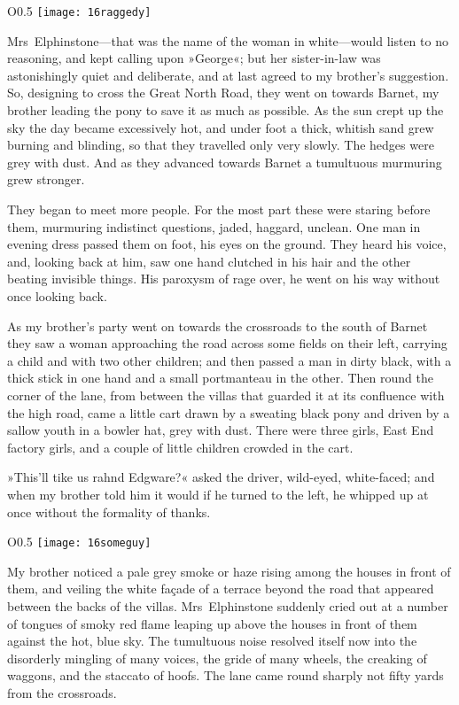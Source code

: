 \begin{wrapfigure}{O}{0.5\textwidth}
\centering
\texttt{[image: 16raggedy]}
\end{wrapfigure}

Mrs~Elphinstone—that was the name of the woman in white—would listen to no reasoning, and kept calling upon »George«; but her sister-in-law was astonishingly quiet and deliberate, and at last agreed to my brother's suggestion. So, designing to cross the Great North Road, they went on towards Barnet, my brother leading the pony to save it as much as possible. As the sun crept up the sky the day became excessively hot, and under foot a thick, whitish sand grew burning and blinding, so that they travelled only very slowly. The hedges were grey with dust. And as they advanced towards Barnet a tumultuous murmuring grew stronger.

They began to meet more people. For the most part these were staring before them, murmuring indistinct questions, jaded, haggard, unclean. One man in evening dress passed them on foot, his eyes on the ground. They heard his voice, and, looking back at him, saw one hand clutched in his hair and the other beating invisible things. His paroxysm of rage over, he went on his way without once looking back.

As my brother's party went on towards the crossroads to the south of Barnet they saw a woman approaching the road across some fields on their left, carrying a child and with two other children; and then passed a man in dirty black, with a thick stick in one hand and a small portmanteau in the other. Then round the corner of the lane, from between the villas that guarded it at its confluence with the high road, came a little cart drawn by a sweating black pony and driven by a sallow youth in a bowler hat, grey with dust. There were three girls, East End factory girls, and a couple of little children crowded in the cart.

»This'll tike us rahnd Edgware?« asked the driver, wild-eyed, white-faced; and when my brother told him it would if he turned to the left, he whipped up at once without the formality of thanks.

\begin{wrapfigure}{O}{0.5\textwidth}
\centering
\texttt{[image: 16someguy]}
\end{wrapfigure}

My brother noticed a pale grey smoke or haze rising among the houses in front of them, and veiling the white façade of a terrace beyond the road that appeared between the backs of the villas. Mrs~Elphinstone suddenly cried out at a number of tongues of smoky red flame leaping up above the houses in front of them against the hot, blue sky. The tumultuous noise resolved itself now into the disorderly mingling of many voices, the gride of many wheels, the creaking of waggons, and the staccato of hoofs. The lane came round sharply not fifty yards from the crossroads.

